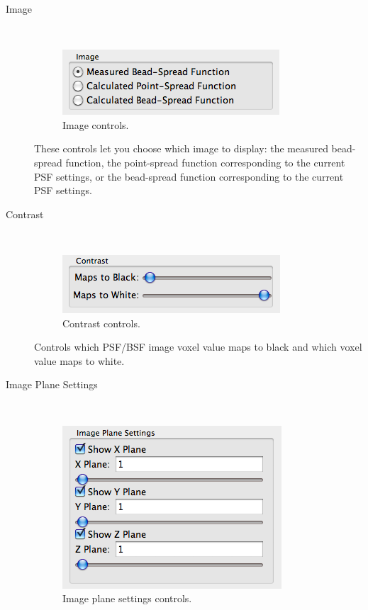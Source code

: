 \documentclass[11pt,titlepage,twoside]{article}
\begin{document}
\begin{description}

  \item[Image] \hfill \\
   
   \begin{figure}[h]
    \centering
    \includegraphics[scale=0.5]{images/ImageControls}
    \caption{Image controls.}
    \label{fig:ImageControls}
  \end{figure}
 
  These controls let you choose which image to display: the measured bead-spread function, the point-spread function corresponding to the current PSF settings, or the bead-spread function corresponding to the current PSF settings.

  \item[Contrast] \hfill \\
  
    \begin{figure}[h]
    \centering
    \includegraphics[scale=0.5]{images/ContrastControls}
    \caption{Contrast controls.}
    \label{fig:ContrastControls}
  \end{figure}
  
  Controls which PSF/BSF image voxel value maps to black and which voxel value maps to white.

  \item[Image Plane Settings] \hfill \\
  
    \begin{figure}[h]
    \centering
    \includegraphics[scale=0.5]{images/ImagePlaneSettingsControls}
    \caption{Image plane settings controls.}
    \label{fig:ImagePlaneSettingsControls}
  \end{figure}
  

\end{description}
\end{document}
